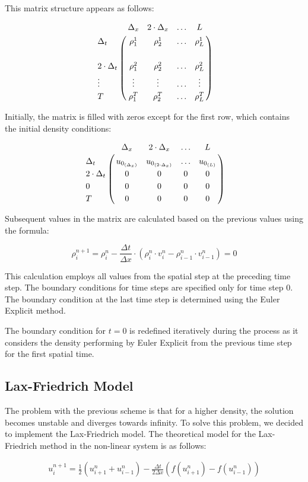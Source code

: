 \documentclass{article}
\begin{document}
		This matrix structure appears as follows:
		
		\begin{align*}
			\bordermatrix { 
				& \Delta_x & 2\cdot \Delta_x & \hdots & L \cr 
				\Delta_t & \rho_1^1 & \rho_2^1 & \hdots & \rho_L^1 \cr \cr
				2\cdot \Delta_t & \rho_1^2 & \rho_2^2 & \hdots & \rho_L^2\cr
				\vdots & \vdots & \vdots & \hdots & \vdots \cr
				T & \rho_1^T & \rho_2^T & \hdots & \rho_L^T}
		\end{align*}
		

		Initially, the matrix is filled with zeros except for the first row, which contains the initial density conditions:

		\begin{align*}
			\bordermatrix { 
				& \Delta_x & 2\cdot \Delta_x & \hdots & L \cr 
				\Delta_t & u_{0_{(\Delta_x)}} & u_{0_{(2 \cdot \Delta_x)}} & \hdots & u_{0_{(L)}} \cr 
				2\cdot \Delta_t & 0 & 0 & 0 & 0\cr
				0 & 0 & 0 & 0 & 0 \cr
				T & 0 & 0 & 0 & 0}
		\end{align*}

		 
	
		Subsequent values in the matrix are calculated based on the previous values using the formula:
		
		\[
		\rho_{i}^{n+1} = \rho_i^n - \frac{\Delta t}{\Delta x} \cdot \left(\rho_i^n \cdot v_i^n - \rho_{i-1}^n \cdot v_{i-1}^n \right) = 0
		\]
		
		This calculation employs all values from the spatial step at the preceding time step. The boundary conditions for time steps are specified only for time step 0. The boundary condition at the last time step is determined using the Euler Explicit method.
		
		The boundary condition for \(t=0\) is redefined iteratively during the process as it considers the density performing by Euler Explicit from the previous time step for the first spatial time.


		\subsection{Lax-Friedrich Model}
		
		The problem with the previous scheme is that for a higher density, the solution becomes unstable and diverges towards infinity. To solve this problem, we decided to implement the Lax-Friedrich model. The theoretical model for the Lax-Friedrich method in the non-linear system is as follows:
		
		\begin{align}
			\boxed{u_{i}^{n+1} = \frac{1}{2}(u_{i+1}^{n} + u_{i-1}^{n}) - \frac{\Delta t}{2\Delta x}(f(u_{i+1}^{n}) - f(u_{i-1}^{n}))}
		\end{align}
		
\end{document}
